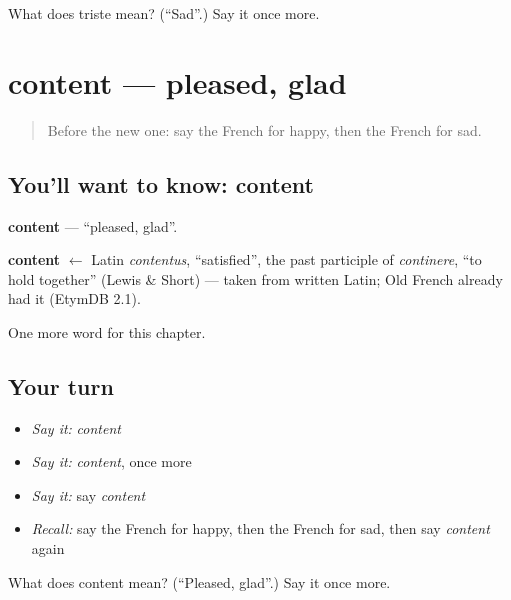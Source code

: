 \begin{tcolorbox}[breakable,colback=teal!4,colframe=teal!35!black,title={Before you move on}]
What does triste mean? (\textquotedblleft{}Sad\textquotedblright{}.) Say it once more.
\end{tcolorbox}
\section[content]{content — pleased, glad}

\label{lesson:FR-C56-content}



\begin{quote}
Before the new one: say the French for happy, then the French for sad.
\end{quote}

\subsection*{You'll want to know: content}
\textbf{content} — \textquotedblleft{}pleased, glad\textquotedblright{}.

\begin{cousinweb}
\textbf{content} $\leftarrow$ Latin \emph{contentus}, \textquotedblleft{}satisfied\textquotedblright{}, the past participle of \emph{continere}, \textquotedblleft{}to hold together\textquotedblright{} (Lewis \& Short) — taken from written Latin; Old French already had it (EtymDB 2.1).
\end{cousinweb}

\begin{grammarlens}[title={What you've built}]
One more word for this chapter.
\end{grammarlens}

\subsection*{Your turn}
\begin{itemize}
\raggedright
  \item \emph{Say it:} \emph{content}
  \item \emph{Say it:} \emph{content}, once more
  \item \emph{Say it:} say \emph{content}
  \item \emph{Recall:} say the French for happy, then the French for sad, then say \emph{content} again
\end{itemize}

\begin{tcolorbox}[breakable,colback=teal!4,colframe=teal!35!black,title={Before you move on}]
What does content mean? (\textquotedblleft{}Pleased, glad\textquotedblright{}.) Say it once more.
\end{tcolorbox}
